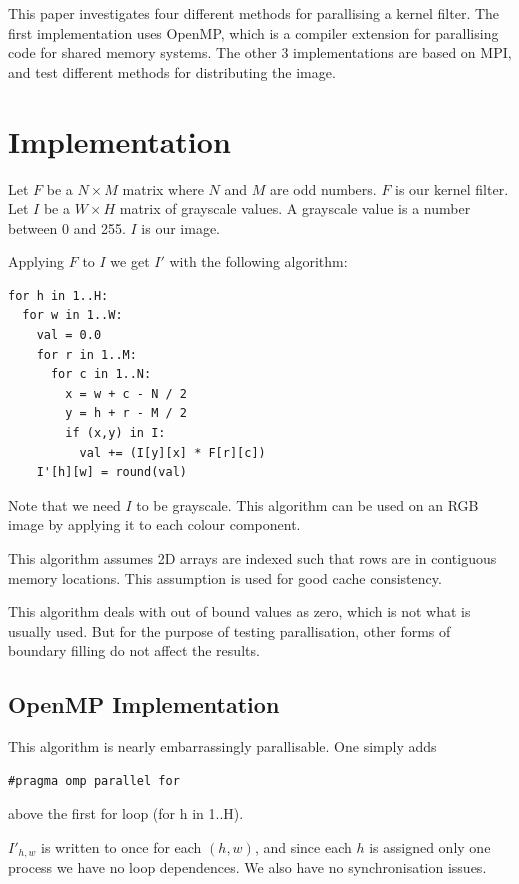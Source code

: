 \documentclass{article}
\begin{document}
This paper investigates four different methods for parallising a kernel
filter. The first implementation uses OpenMP, which is a compiler extension
for parallising code for shared memory systems. The other 3 implementations
are based on MPI, and test different methods for distributing the image.

\section{Implementation}

Let $F$ be a $N \times M$ matrix where $N$ and $M$ are odd numbers. $F$ is our
kernel filter. Let $I$ be a $W \times H$ matrix of grayscale values. A
grayscale value is a number between 0 and 255. $I$ is our image.

Applying $F$ to $I$ we get $I'$ with the following algorithm:

\begin{verbatim}
for h in 1..H:
  for w in 1..W:
    val = 0.0
    for r in 1..M:
      for c in 1..N:
        x = w + c - N / 2
        y = h + r - M / 2
        if (x,y) in I:
          val += (I[y][x] * F[r][c])
    I'[h][w] = round(val)
\end{verbatim}

Note that we need $I$ to be grayscale. This algorithm can be used on an RGB
image by applying it to each colour component.

This algorithm assumes 2D arrays are indexed such that rows are in contiguous
memory locations. This assumption is used for good cache consistency.

This algorithm deals with out of bound values as zero, which is not what is
usually used. But for the purpose of testing parallisation, other forms of
boundary filling do not affect the results.


\subsection{OpenMP Implementation}

This algorithm is nearly embarrassingly parallisable. One simply adds
\begin{verbatim}
#pragma omp parallel for
\end{verbatim}
above the first for loop (for h in 1..H).

$I'_{h,w}$ is written to once for each $(h,w)$, and since each $h$ is assigned
only one process we have no loop dependences. We also have no synchronisation
issues.
\end{document}
